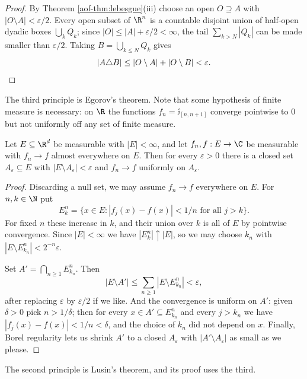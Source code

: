 \begin{proof}
	By Theorem \ref{aof-thm:lebesgue}(iii) choose an open $O \supseteq A$ with $|O \setminus A| < \varepsilon/2$. Every open subset of $\R^n$ is a countable disjoint union of half-open dyadic boxes $\bigcup_{k} Q_k$; since $|O| \le |A| + \varepsilon/2 < \infty$, the tail $\sum_{k > N} |Q_k|$ can be made smaller than $\varepsilon/2$. Taking $B = \bigcup_{k \le N} Q_k$ gives
	$$|A \triangle B| \le |O \setminus A| + |O \setminus B| < \varepsilon. \qedhere$$
\end{proof}

The third principle is Egorov's theorem. Note that some hypothesis of finite measure is necessary: on $\R$ the functions $f_n = \ii_{[n, n+1]}$ converge pointwise to $0$ but not uniformly off any set of finite measure.

\begin{theorem}[Egorov]\label{thm:egorov}
	Let $E \subseteq \R^d$ be measurable with $|E| < \infty$, and let $f_n, f : E \to \C$ be measurable with $f_n \to f$ almost everywhere on $E$. Then for every $\varepsilon > 0$ there is a closed set $A_\varepsilon \subseteq E$ with $|E \setminus A_\varepsilon| < \varepsilon$ and $f_n \to f$ uniformly on $A_\varepsilon$.
\end{theorem}

\begin{proof}
	Discarding a null set, we may assume $f_n \to f$ everywhere on $E$. For $n, k \in \N$ put
	$$E^n_k = \{ x \in E : |f_j(x) - f(x)| < 1/n \text{ for all } j > k\}.$$
	For fixed $n$ these increase in $k$, and their union over $k$ is all of $E$ by pointwise convergence. Since $|E| < \infty$ we have $|E^n_k| \uparrow |E|$, so we may choose $k_n$ with $|E \setminus E^n_{k_n}| < 2^{-n} \varepsilon$.

	Set $A' = \bigcap_{n \ge 1} E^n_{k_n}$. Then
	$$|E \setminus A'| \le \sum_{n \ge 1} |E \setminus E^n_{k_n}| < \varepsilon,$$
	after replacing $\varepsilon$ by $\varepsilon/2$ if we like. And the convergence is uniform on $A'$: given $\delta > 0$ pick $n > 1/\delta$; then for every $x \in A' \subseteq E^n_{k_n}$ and every $j > k_n$ we have $|f_j(x) - f(x)| < 1/n < \delta$, and the choice of $k_n$ did not depend on $x$. Finally, Borel regularity lets us shrink $A'$ to a closed $A_\varepsilon$ with $|A' \setminus A_\varepsilon|$ as small as we please.
\end{proof}

The second principle is Lusin's theorem, and its proof uses the third.

